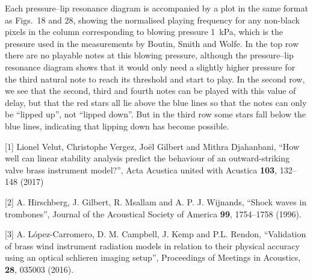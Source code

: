 





  Each pressure--lip resonance diagram is accompanied by a plot in the same 
  format as Figs.\ 18 and 28, showing the normalised playing frequency for any 
  non-black pixels in the column corresponding to blowing pressure 1~kPa, which 
  is the pressure used in the measurements by Boutin, Smith and Wolfe. In the 
  top row there are no playable notes at this blowing pressure, although the 
  pressure--lip resonance diagram shows that it would only need a slightly 
  higher pressure for the third natural note to reach its threshold and start 
  to play. In the second row, we see that the second, third and fourth notes 
  can be played with this value of delay, but that the red stars all lie above 
  the blue lines so that the notes can only be “lipped up”, not “lipped down”. 
  But in the third row some stars fall below the blue lines, indicating that 
  lipping down has become possible. 











  \sectionreferences{}[1] Lionel Velut, Christophe Vergez, Joël Gilbert and 
  Mithra Djahanbani, “How well can linear stability analysis predict the 
  behaviour of an outward-striking valve brass instrument model?”, Acta 
  Acustica united with Acustica \textbf{103}, 132–148 (2017) 

  [2] A. Hirschberg, J. Gilbert, R. Msallam and A. P. J. Wijnands, “Shock waves 
  in trombones”, Journal of the Acoustical Society of America \textbf{99}, 
  1754–1758 (1996). 

  [3] A. López-Carromero, D. M. Campbell, J. Kemp and P.L. Rendon, “Validation 
  of brass wind instrument radiation models in relation to their physical 
  accuracy using an optical schlieren imaging setup”, Proceedings of Meetings 
  in Acoustics, \textbf{28}, 035003 (2016). 

